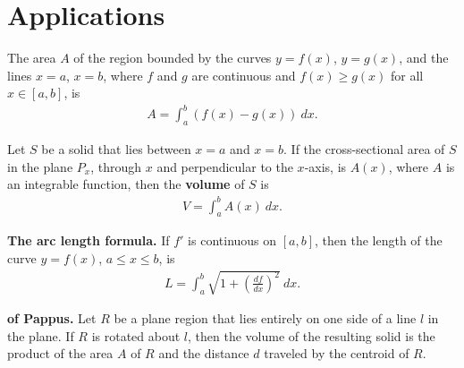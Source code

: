 \documentclass{article}
\begin{document}
\section{Applications}
\begin{definition}
    The area $A$ of the region bounded by the curves $y=f(x)$, $y=g(x)$, and the lines $x=a$, $x=b$, where $f$ and $g$ are continuous and $f(x)\geq g(x)$ for all $x\in[a,b]$, is
    \begin{align*}
        A=\int_a^b \left(f(x)-g(x)\right)\:dx.
    \end{align*}
\end{definition}
\begin{definition}
    Let $S$ be a solid that lies between $x=a$ and $x=b$. If the cross-sectional area of $S$ in the plane $P_x$, through $x$ and perpendicular to the $x$-axis, is $A(x)$, where $A$ is an integrable function, then the \textbf{volume} of $S$ is
    \begin{align*}
        V=\int_a^b A(x)\:dx.
    \end{align*}
\end{definition}
\begin{theorem}
    \textbf{The arc length formula.} If $f'$ is continuous on $[a,b]$, then the length of the curve $y=f(x)$, $a\leq x \leq b$, is
    \begin{align*}
        L = \int_a^b \sqrt{1+\left(\frac{df}{dx}\right)^2}\:dx.
    \end{align*}
\end{theorem}
\begin{theorem}
    \textbf{of Pappus.} Let $R$ be a plane region that lies entirely on one side of a line $l$ in the plane. 
    If $R$ is rotated about $l$, then the volume of the resulting solid is the product of the area $A$ of $R$ and the distance $d$ traveled by the centroid of $R$.
\end{theorem}
\end{document}
